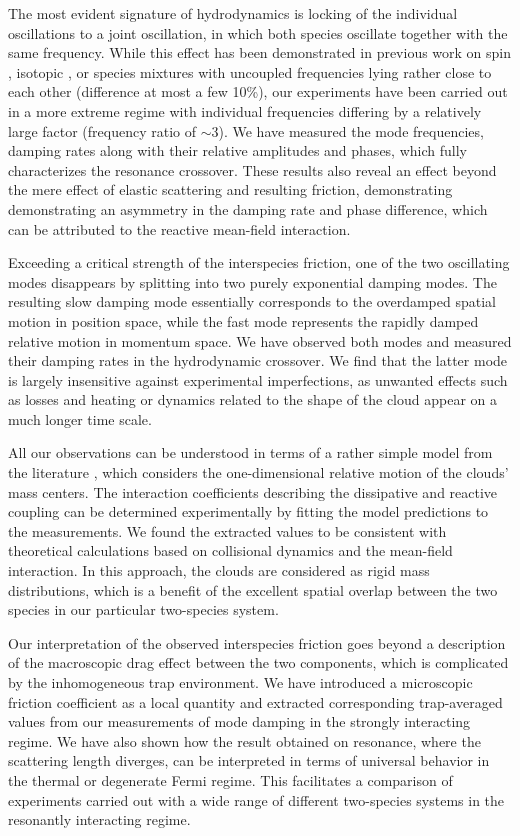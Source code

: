 The most evident signature of hydrodynamics is locking of the individual oscillations to a joint oscillation, in which both species oscillate together with the same frequency. While this effect has been demonstrated in previous work on spin \cite{Gensemer2001tfc}, isotopic \cite{Delehaye2015cva}, or species mixtures \cite{Ferlaino2003doi, Finelli2024ula} with uncoupled frequencies lying rather close to each other (difference at most a few 10\%), our experiments have been carried out in a more extreme regime with individual frequencies differing by a relatively large factor (frequency ratio of $\sim$3).  We have measured the mode frequencies, damping rates along with their relative amplitudes and phases, which fully characterizes the resonance crossover. {These results also reveal an effect beyond %
the mere effect of elastic scattering and resulting friction, demonstrating demonstrating an asymmetry in the damping rate and phase difference, which can be attributed to the reactive mean-field interaction.} 

Exceeding a critical strength of the interspecies friction, one of the two oscillating modes disappears by splitting into two purely exponential damping modes. The resulting slow damping mode essentially corresponds to the overdamped spatial motion in position space, while the fast mode represents the rapidly damped relative motion in momentum space. We have observed both modes and measured their damping rates in the hydrodynamic crossover. We find that the latter mode is largely insensitive against experimental imperfections, as unwanted effects such as losses and heating or dynamics related to the shape of the cloud appear on a much longer time scale.

All our observations can be understood in terms of a rather simple model from the literature \cite{Gensemer2001tfc, Ferlaino2003doi, Chiacchiera2010doi, Asano2020doo}, which considers the one-dimensional relative motion of the clouds' mass centers. The interaction coefficients describing the dissipative and reactive coupling can be determined experimentally by fitting the model predictions to the measurements. We found the extracted values to be consistent with theoretical calculations based on collisional dynamics and the mean-field interaction. In this approach, the clouds are considered as rigid mass distributions, which is a benefit of the excellent spatial overlap between the two species in our particular two-species system. 

Our interpretation of the {observed interspecies friction goes beyond a description of the macroscopic drag effect} between the two components, which is complicated by the inhomogeneous trap environment. We have introduced a microscopic friction coefficient as a local quantity and extracted corresponding {trap-averaged} values from our measurements of mode damping in the strongly interacting regime. We have also shown how the result obtained on resonance, where the scattering length diverges, can be interpreted in terms of universal behavior in the thermal or degenerate Fermi regime. This facilitates a comparison of experiments carried out with a wide range of different two-species systems in the resonantly interacting regime.

